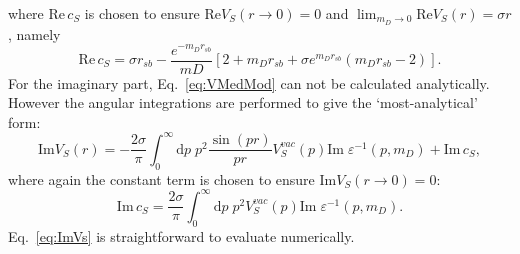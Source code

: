 \documentclass[12pt,a4paper]{article}
\newcommand{\brac}[1] {\!\left(#1\right)}
\newcommand{\rsb}{r_{sb}}
\begin{document}
where \(\mathrm{Re}\,c_S\) is chosen to ensure \(\mathrm{Re}V_{S}\brac{r\to 0}=0\) and \(\lim_{m_D\to0}\mathrm{Re}V_{S}\brac{r}=\sigma r\), namely
\begin{equation}
\mathrm{Re}\,c_S=\sigma\rsb-\frac{e^{-m_D\rsb}}{mD}\left[2+m_D\rsb+\sigma e^{m_D\rsb}\brac{m_D\rsb-2}\right].
\end{equation}
For the imaginary part, Eq.~\eqref{eq:VMedMod} can not be calculated analytically. However the angular integrations are performed to give the `most-analytical' form:
\begin{equation}
\label{eq:ImVs}
\mathrm{Im}V_{S}\brac{r}=-\frac{2\sigma}{\pi}\int_{0}^{\infty}\mathrm{d}p\;p^2\frac{\sin\brac{pr}}{pr}V^{vac}_{S}\brac{p}\mathrm{Im}\;\varepsilon^{-1}\brac{p,m_D}+\mathrm{Im}\,c_S,
\end{equation}
where again the constant term is chosen to ensure \(\mathrm{Im}V_{S}\brac{r\to 0}=0\):
\begin{equation}
\mathrm{Im}\,c_S=\frac{2\sigma}{\pi}\int_{0}^{\infty}\mathrm{d}p\;p^2V^{vac}_{S}\brac{p}\mathrm{Im}\;\varepsilon^{-1}\brac{p,m_D}.
\end{equation}
Eq.~\eqref{eq:ImVs} is straightforward to evaluate numerically.
\end{document}
